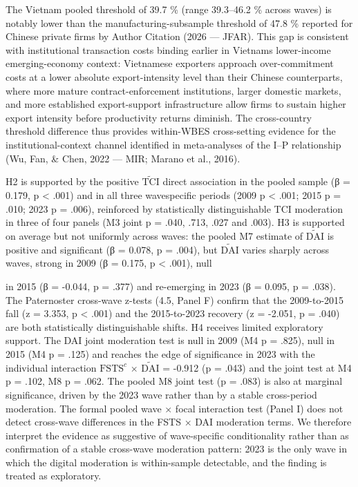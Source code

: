 \documentclass[12pt,a4paper]{article}
\begin{document}
The Vietnam pooled threshold of 39.7 \% (range 39.3--46.2 \% across
waves) is notably lower than the manufacturing-subsample threshold of
47.8 \% reported for Chinese private firms by Author Citation (2026 ---
JFAR). This gap is consistent with institutional transaction costs
binding earlier in Vietnam\textquotesingle s lower-income
emerging-economy context: Vietnamese exporters approach over-commitment
costs at a lower absolute export-intensity level than their Chinese
counterparts, where more mature contract-enforcement institutions,
larger domestic markets, and more established export-support
infrastructure allow firms to sustain higher export intensity before
productivity returns diminish. The cross-country threshold difference
thus provides within-WBES cross-setting evidence for the
institutional-context channel identified in meta-analyses of the I--P
relationship (Wu, Fan, \& Chen, 2022 --- MIR; Marano et al., 2016).

H2 is supported by the positive \(\tilde{\mathrm{TCI}}\) direct
association in the pooled sample (β = 0.179, p \textless{} .001) and in
all three wavespecific periods (2009 p \textless{} .001; 2015 p = .010;
2023 p = .006), reinforced by statistically distinguishable TCI
moderation in three of four panels (M3 joint p = .040, .713, .027 and
.003). H3 is supported on average but not uniformly across waves: the
pooled M7 estimate of \(\tilde{\mathrm{DAI}}\) is positive and
significant (β = 0.078, p = .004), but \(\tilde{\mathrm{DAI}}\) varies
sharply across waves, strong in 2009 (β = 0.175, p \textless{} .001),
null

in 2015 (β = -0.044, p = .377) and re-emerging in 2023 (β = 0.095, p =
.038). The Paternoster cross-wave z-tests (4.5, Panel F) confirm that
the 2009-to-2015 fall (z = 3.353, p \textless{} .001) and the
2015-to-2023 recovery (z = -2.051, p = .040) are both statistically
distinguishable shifts. H4 receives limited exploratory support. The DAI
joint moderation test is null in 2009 (M4 p = .825), null in 2015 (M4 p
= .125) and reaches the edge of significance in 2023 with the individual
interaction \(\mathrm{FSTS}^{c}\) × \(\tilde{\mathrm{DAI}}\) = -0.912 (p
= .043) and the joint test at M4 p = .102, M8 p = .062. The pooled M8
joint test (p = .083) is also at marginal significance, driven by the
2023 wave rather than by a stable cross-period moderation. The formal
pooled wave × focal interaction test (Panel I) does not detect
cross-wave differences in the FSTS × DAI moderation terms. We therefore
interpret the evidence as suggestive of wave-specific conditionality
rather than as confirmation of a stable cross-wave moderation pattern:
2023 is the only wave in which the digital moderation is within-sample
detectable, and the finding is treated as exploratory.
\end{document}
